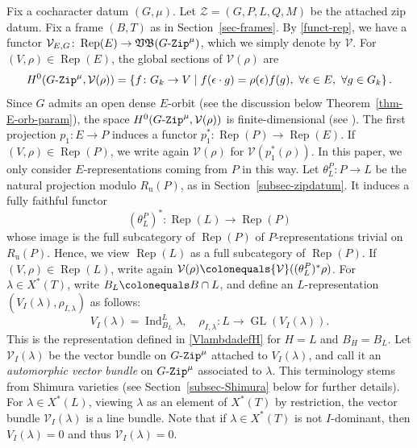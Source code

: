 \documentclass[10pt,a4paper]{article}
\numberwithin{equation}{section}
\theoremstyle{definition}
\theoremstyle{remark}
\newcommand{\GZip}{\mathop{\text{$G$-{\tt Zip}}}\nolimits}
\newcommand{\VB}{\mathfrak{VB}}
\newcommand{\Vcal}{{\mathcal V}}
\newcommand{\Zcal}{{\mathcal Z}}
\DeclareMathOperator{\Rep}{Rep}
\DeclareMathOperator{\GL}{GL}
\DeclareMathOperator{\Ind}{Ind}
\newcommand{\lra}{\longrightarrow}
\begin{document}
Fix a cocharacter datum $(G,\mu)$. Let $\Zcal=(G,P,L,Q,M)$ be the attached zip datum. Fix a frame $(B,T)$ as in Section~\ref{sec-frames}. By \eqref{funct-rep}, we have a functor $\Vcal_{E,G}\colon \Rep(E)\to \VB(\GZip^\mu)$, which we simply denote by $\Vcal$. For $(V,\rho)\in \Rep(E)$, the global sections of $\Vcal(\rho)$ are
\[
 H^0(\GZip^\mu,\Vcal(\rho))=\left\{f \colon G_k \to V \mid f(\epsilon \cdot g)=\rho(\epsilon) f(g) , \ \forall\epsilon\in E, \ \forall g\in G_k \right\}.
\]
Since $G$ admits an open dense $E$-orbit (see the discussion below Theorem~\ref{thm-E-orb-param}), the space $H^0(\GZip^\mu,\Vcal(\rho))$ is finite-dimensional (see \cite[Lemma 1.2.1]{Koskivirta-automforms-GZip}). The first projection $p_1 \colon E\to P$ induces a functor $p_1^* \colon \Rep(P)\to \Rep(E)$. If $(V,\rho)\in \Rep(P)$, we write again $\Vcal(\rho)$ for $\Vcal(p_1^*(\rho))$. In this paper, we only consider $E$-representations coming from $P$ in this way. Let $\theta^P_L \colon P\to L$ be the natural projection modulo $R_{\mathrm{u}}(P)$, as in Section~\ref{subsec-zipdatum}. It induces a fully faithful functor
\begin{equation}
(\theta^P_L)^* \colon \Rep(L)\lra \Rep(P)  
\end{equation}
whose image is the full subcategory of $\Rep(P)$ of $P$-representations trivial on $R_{\mathrm{u}}(P)$. Hence, we view $\Rep(L)$ as a full subcategory of $\Rep(P)$. If $(V,\rho)\in \Rep(L)$, write again $\Vcal(\rho) \colonequals \Vcal((\theta^P_L)^*\rho)$. For $\lambda\in X^*(T)$, write $B_L \colonequals B\cap L$, and define an $L$-representation $(V_I(\lambda),\rho_{I,\lambda})$ as follows: 
\begin{equation}\label{equ-VlambdaL}
V_I(\lambda)=\Ind_{B_L}^L \lambda, \quad \rho_{I,\lambda}\colon L\lra \GL(V_I(\lambda)). 
\end{equation}
This is the representation defined in \eqref{VlambdadefH} for $H=L$ and $B_H=B_L$. Let $\Vcal_I(\lambda)$ be the vector bundle on $\GZip^\mu$ attached to $V_I(\lambda)$, and call it an \emph{automorphic vector bundle} on $\GZip^\mu$ associated to $\lambda$. This terminology stems from Shimura varieties (see Section~\ref{subsec-Shimura} below for further details). For $\lambda \in X^*(L)$, viewing $\lambda$ as an element of $X^*(T)$ by restriction, the vector bundle $\Vcal_I(\lambda)$ is a line bundle. Note that if $\lambda\in X^*(T)$ is not $I$-dominant, then $V_I(\lambda)=0$ and thus $\Vcal_I(\lambda)=0$.
\end{document}
